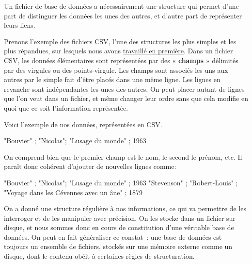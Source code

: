 \documentclass[
  letterpaper,
  DIV=11,
  numbers=noendperiod]{scrartcl}
\newenvironment{Shaded}{\begin{snugshade}}{\end{snugshade}}
\newcommand{\CommentTok}[1]{\textcolor[rgb]{0.37,0.37,0.37}{#1}}
\newcommand{\DecValTok}[1]{\textcolor[rgb]{0.68,0.00,0.00}{#1}}
\newcommand{\OperatorTok}[1]{\textcolor[rgb]{0.37,0.37,0.37}{#1}}
\newcommand{\StringTok}[1]{\textcolor[rgb]{0.13,0.47,0.30}{#1}}
\begin{document}
Un fichier de base de données a nécessairement une structure qui permet
d'une part de distinguer les données les unes des autres, et d'autre
part de représenter leurs liens.

Prenons l'exemple des fichiers CSV, l'une des structures les plus
simples et les plus répandues, sur lesquels nous avons
\href{https://flallemand.fr/nsi/premiere/07_tables/tables_cours/}{travaillé
en première}. Dans un fichier CSV, les données élémentaires sont
représentées par des « \textbf{champs} » délimités par des virgules ou
des points-virgule. Les champs sont associés les uns aux autres par le
simple fait d'être placés dans une même ligne. Les lignes en revanche
sont indépendantes les unes des autres. On peut placer autant de lignes
que l'on veut dans un fichier, et même changer leur ordre sans que cela
modifie en quoi que ce soit l'information représentée.

Voici l'exemple de nos données, représentées en CSV.

\begin{Shaded}
\begin{Highlighting}[]
\CommentTok{"Bouvier"} \OperatorTok{;} \StringTok{"Nicolas"}\OperatorTok{;} \StringTok{"L\textquotesingle{}usage du monde"} \OperatorTok{;} \DecValTok{1963}
\end{Highlighting}
\end{Shaded}

On comprend bien que le premier champ est le nom, le second le prénom,
etc. Il paraît donc cohérent d'ajouter de nouvelles lignes comme:

\begin{Shaded}
\begin{Highlighting}[]
\CommentTok{"Bouvier"}   \OperatorTok{;} \StringTok{"Nicolas"}\OperatorTok{;} \StringTok{"L\textquotesingle{}usage du monde"} \OperatorTok{;} \DecValTok{1963}
\CommentTok{"Stevenson"} \OperatorTok{;} \StringTok{"Robert{-}Louis"}  \OperatorTok{;} \StringTok{"Voyage dans les Cévennes avec un âne"} \OperatorTok{;} \DecValTok{1879}
\end{Highlighting}
\end{Shaded}

On a donné une structure régulière à nos informations, ce qui va
permettre de les interroger et de les manipuler avec précision. On les
stocke dans un fichier sur disque, et nous sommes donc en cours de
constitution d'une véritable base de données. On peut en fait
généraliser ce constat~: une base de données est toujours un ensemble de
fichiers, stockés sur une mémoire externe comme un disque, dont le
contenu obéit à certaines règles de structuration.
\end{document}
